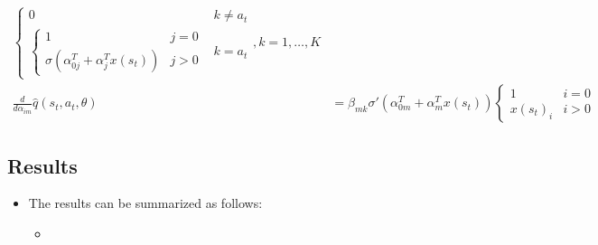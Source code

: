 \documentclass[a4paper]{article}
\begin{document}
\begin{itemize}
\begin{align*}
        \begin{cases}
            0 & k \ne a_t\\
            \begin{cases}
                1 & j = 0\\
                \sigma(\alpha^{T}_{0j} + \alpha^{T}_{j}x(s_t)) & j > 0
            \end{cases} &  k = a_t
        \end{cases}, k = 1, \dots, K\\
        \frac{d}{d\alpha_{im}}\hat{q}(s_t, a_t, \theta) &=
        \beta_{mk}
        \sigma'(\alpha^{T}_{0m} + \alpha^{T}_{m}x(s_t))
        \begin{cases}
            1 & i = 0\\
            x(s_t)_{i} & i > 0
        \end{cases}
    \end{align*}
\end{itemize}
\subsection*{Results}
\begin{centering}
\end{centering}
\begin{itemize}
    \item The results can be summarized as follows:
    \begin{itemize}
        \item 
    \end{itemize}
\end{itemize}
\end{document}
